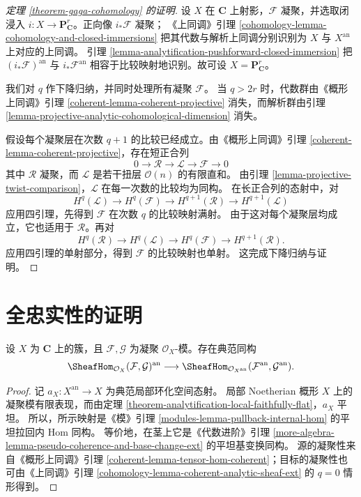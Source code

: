 \begin{proof}[定理 \ref{theorem-gaga-cohomology} 的证明]
设 $X$ 在 $\mathbf C$ 上射影，$\mathcal F$ 凝聚，并选取闭浸入
$i:X\to\mathbf P^r_{\mathbf C}$。正向像 $i_*\mathcal F$ 凝聚；
《上同调》引理 \ref{cohomology-lemma-cohomology-and-closed-immersions}
把其代数与解析上同调分别识别为 $X$ 与 $X^{\mathrm{an}}$ 上对应的上同调。
引理 \ref{lemma-analytification-pushforward-closed-immersion}
把 $(i_*\mathcal F)^{\mathrm{an}}$ 与 $i_*\mathcal F^{\mathrm{an}}$
相容于比较映射地识别。故可设 $X=\mathbf P^r_{\mathbf C}$。

我们对 $q$ 作下降归纳，并同时处理所有凝聚 $\mathcal F$。
当 $q>2r$ 时，代数群由《概形上同调》引理
\ref{coherent-lemma-coherent-projective} 消失，而解析群由引理
\ref{lemma-projective-analytic-cohomological-dimension} 消失。

假设每个凝聚层在次数 $q+1$ 的比较已经成立。由《概形上同调》引理
\ref{coherent-lemma-coherent-projective}，存在短正合列
$$
0\longrightarrow\mathcal R\longrightarrow
\mathcal L\longrightarrow\mathcal F\longrightarrow0
$$
其中 $\mathcal R$ 凝聚，而 $\mathcal L$ 是若干扭层 $\mathcal O(n)$ 的有限直和。
由引理 \ref{lemma-projective-twist-comparison}，$\mathcal L$ 在每一次数的比较均为同构。
在长正合列的态射中，对
$$
H^q(\mathcal L)\longrightarrow H^q(\mathcal F)
\longrightarrow H^{q+1}(\mathcal R)\longrightarrow H^{q+1}(\mathcal L)
$$
应用四引理，先得到 $\mathcal F$ 在次数 $q$ 的比较映射满射。
由于这对每个凝聚层均成立，它也适用于 $\mathcal R$。再对
$$
H^q(\mathcal R)\longrightarrow H^q(\mathcal L)
\longrightarrow H^q(\mathcal F)\longrightarrow H^{q+1}(\mathcal R).
$$
应用四引理的单射部分，得到 $\mathcal F$ 的比较映射也单射。
这完成下降归纳与证明。
\end{proof}

\section{全忠实性的证明}
\label{section-proof-gaga-fully-faithful}

\begin{lemma}
\label{lemma-analytification-internal-hom}
设 $X$ 为 $\mathbf C$ 上的簇，且 $\mathcal F,\mathcal G$ 为凝聚
$\mathcal O_X$-模。存在典范同构
$$
\SheafHom_{\mathcal O_X}(\mathcal F,\mathcal G)^{\mathrm{an}}
\longrightarrow
\SheafHom_{\mathcal O_{X^{\mathrm{an}}}}
(\mathcal F^{\mathrm{an}},\mathcal G^{\mathrm{an}}).
$$
\end{lemma}

\begin{proof}
记 $a_X:X^{\mathrm{an}}\to X$ 为典范局部环化空间态射。
局部 Noetherian 概形 $X$ 上的凝聚模有限表现，而由定理
\ref{theorem-analytification-local-faithfully-flat}，$a_X$ 平坦。
所以，所示映射是《模》引理
\ref{modules-lemma-pullback-internal-hom} 的平坦拉回内 Hom 同构。
等价地，在茎上它是《代数进阶》引理
\ref{more-algebra-lemma-pseudo-coherence-and-base-change-ext} 的平坦基变换同构。
源的凝聚性来自《概形上同调》引理
\ref{coherent-lemma-tensor-hom-coherent}；目标的凝聚性也可由《上同调》引理
\ref{cohomology-lemma-coherent-analytic-sheaf-ext} 的 $q=0$ 情形得到。
\end{proof}

